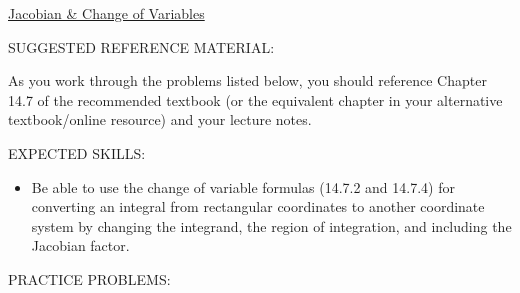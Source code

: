 \documentclass[12pt]{article}
\begin{document}
\begin{center}
\underline{\LARGE{Jacobian \& Change of Variables}}
\end{center}

\noindent SUGGESTED REFERENCE MATERIAL:

\bigskip

\noindent As you work through the problems listed below, you should reference Chapter 14.7 of the recommended textbook (or the equivalent chapter in your alternative textbook/online resource) and your lecture notes.

\bigskip

\noindent EXPECTED SKILLS:

\begin{itemize}

\item Be able to use the change of variable formulas (14.7.2 and 14.7.4) for converting an integral from rectangular coordinates to another coordinate system by changing the integrand, the region of integration, and including the Jacobian factor.

\end{itemize}

\noindent PRACTICE PROBLEMS:

\medskip
\end{document}
